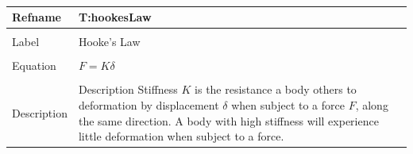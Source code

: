 \documentclass[12pt]{article}
\begin{document}
~\newline
\noindent \begin{minipage}{\textwidth}
\begin{tabular}{p{} p{}}
\toprule \textbf{Refname} & \textbf{T:hookesLaw}
\label{T:hookesLaw}
\\ \midrule \\
Label & Hooke's Law
\\ \midrule \\
Equation & $F=K \delta{}$
\\ \midrule \\
Description & Description Stiffness $K$ is the resistance a body others to deformation by displacement $\delta{}$ when subject to a force $F$, along the same direction. A body with high stiffness will experience little deformation when subject to a force.
\\ \bottomrule \end{tabular}
\end{minipage}\\
\end{document}
